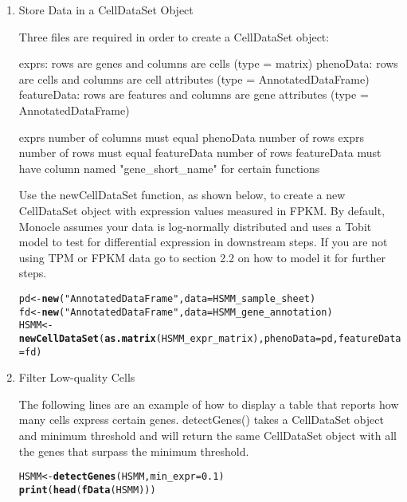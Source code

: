 \documentclass[10pt,oneside]{article}\usepackage[]{graphicx}\usepackage[]{color}
\makeatletter
\newcommand{\hlnum}[1]{\textcolor[rgb]{0.686,0.059,0.569}{#1}}%
\newcommand{\hlstr}[1]{\textcolor[rgb]{0.192,0.494,0.8}{#1}}%
\newcommand{\hlstd}[1]{\textcolor[rgb]{0.345,0.345,0.345}{#1}}%
\newcommand{\hlkwb}[1]{\textcolor[rgb]{0.69,0.353,0.396}{#1}}%
\newcommand{\hlkwc}[1]{\textcolor[rgb]{0.333,0.667,0.333}{#1}}%
\newcommand{\hlkwd}[1]{\textcolor[rgb]{0.737,0.353,0.396}{\textbf{#1}}}%
\newenvironment{kframe}{%
 \def\at@end@of@kframe{}%
 \ifinner\ifhmode%
  \def\at@end@of@kframe{\end{minipage}}%
  \begin{minipage}{\columnwidth}%
 \fi\fi%
 \def\FrameCommand##1{\hskip\@totalleftmargin \hskip-\fboxsep
 \colorbox{shadecolor}{##1}\hskip-\fboxsep
     \hskip-\linewidth \hskip-\@totalleftmargin \hskip\columnwidth}%
 \MakeFramed {\advance\hsize-\width
   \@totalleftmargin\z@ \linewidth\hsize
   \@setminipage}}%
 {\par\unskip\endMakeFramed%
 \at@end@of@kframe}
\newenvironment{knitrout}{}{} %
\makeatother
\begin{document}
 \begin{enumerate}
 \item Store Data in a CellDataSet Object
 
 Three files are required in order to create a CellDataSet object: 
 
 exprs: rows are genes and columns are cells (type = matrix)
 phenoData: rows are cells and columns are cell attributes (type = AnnotatedDataFrame)
 featureData: rows are features and columns are gene attributes (type = AnnotatedDataFrame)
 
 exprs number of columns must equal phenoData number of rows
 exprs number of rows must equal featureData number of rows
 featureData must have column named "gene\_short\_name" for certain functions
 
 Use the newCellDataSet function, as shown below, to create a new CellDataSet object with expression values measured in FPKM.  By default, Monocle assumes your data is log-normally distributed and uses a Tobit model to test for differential expression
 in downstream steps. If you are not using TPM or FPKM data go to section 2.2 on how to model it for further steps.
 
\begin{knitrout}
\color{fgcolor}\begin{kframe}
\begin{alltt}
\hlstd{pd} \hlkwb{<-} \hlkwd{new}\hlstd{(}\hlstr{"AnnotatedDataFrame"}\hlstd{,} \hlkwc{data} \hlstd{= HSMM_sample_sheet)}
\hlstd{fd} \hlkwb{<-} \hlkwd{new}\hlstd{(}\hlstr{"AnnotatedDataFrame"}\hlstd{,} \hlkwc{data} \hlstd{= HSMM_gene_annotation)}
\hlstd{HSMM} \hlkwb{<-} \hlkwd{newCellDataSet}\hlstd{(}\hlkwd{as.matrix}\hlstd{(HSMM_expr_matrix),} \hlkwc{phenoData} \hlstd{= pd,} \hlkwc{featureData} \hlstd{= fd)}
\end{alltt}
\end{kframe}
\end{knitrout}
 
 \item Filter Low-quality Cells
 
The following lines are an example of how to display a table that reports how many cells express certain genes. detectGenes() takes a CellDataSet object and minimum threshold and will return the same CellDataSet object with all the genes that surpass the minimum threshold. 
\begin{knitrout}
\color{fgcolor}\begin{kframe}
\begin{alltt}
\hlstd{HSMM} \hlkwb{<-} \hlkwd{detectGenes}\hlstd{(HSMM,} \hlkwc{min_expr} \hlstd{=} \hlnum{0.1}\hlstd{)}
\hlkwd{print}\hlstd{(}\hlkwd{head}\hlstd{(}\hlkwd{fData}\hlstd{(HSMM)))}
\end{alltt}
\end{kframe}
\end{knitrout}
 

\end{enumerate}
\end{document}
